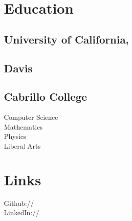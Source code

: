 \documentclass[]{deedy-resume-openfont}
\begin{document}
%
%



%
%

\begin{minipage}[t]{0.33\textwidth} 

\section{Education} 
\subsection{University of California,}
\subsection{Davis}
\sectionsep

\subsection{Cabrillo College}
Computer Science \\
Mathematics \\
Physics\\ 
Liberal Arts\\

\sectionsep



\section{Links} 
Github:// \href{https://github.com/Frushtration}{} \\
LinkedIn://  \href{https://www.linkedin.com/in/cjfrush/}{} \\


\end{minipage}
\end{document}
